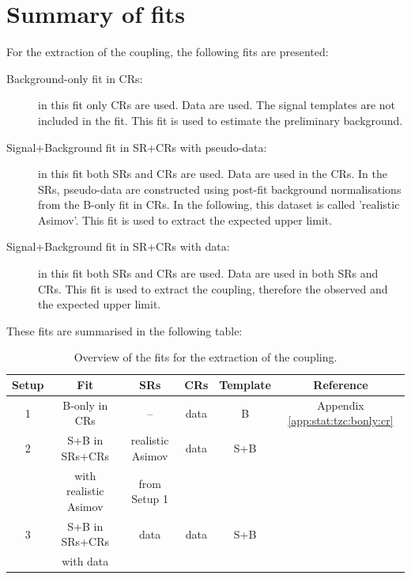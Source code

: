 \section{Summary of fits}
\label{sec:stat:summary}
For the extraction of the \tZc coupling, the following fits
are presented:
\begin{description}
	\item[Background-only fit in CRs:] in this fit only CRs are used. Data are
	used. The signal templates are not included in the fit. This fit is used to estimate
	the preliminary background.
	\item[Signal+Background fit in SR+CRs with pseudo-data:] in this fit both SRs and CRs are used.
	Data are used in the CRs. In the SRs, pseudo-data are constructed
	using post-fit background normalisations from the B-only fit in CRs. In the following, this dataset is called 'realistic Asimov'. This fit is used to extract the expected upper limit.
	\item[Signal+Background fit in SR+CRs with data:] in this fit both SRs and CRs are used. Data are used in both 
	SRs and CRs. This fit is used to extract the \tZc coupling, therefore the observed and the expected upper limit.
\end{description}
These fits are summarised in the following table:

\begin{table}[htbp]
	\small
	\centering
	\begin{tabular}{cccccc}
		\toprule
		Setup & Fit & SRs & CRs & Template & Reference \\
		\midrule
		1 & B-only in CRs & -- & data & B  & Appendix \ref{app:stat:tzc:bonly:cr} \\
		\midrule
		2 & S+B in SRs+CRs & realistic Asimov & data & S+B  & \Cref{sec:stat:tzc:splusb:crsr} \\
		& with realistic Asimov & from Setup 1 & & & \\
		\midrule
		3 & S+B in SRs+CRs & data & data & S+B  & \Cref{sec:stat:tzc:splusb:unb} \\
		& with data & & & & \\
		\bottomrule
	\end{tabular}
	\caption{
	Overview of the fits for the extraction of the \tZc coupling.}%
\label{tab:summary_fits}
\end{table}


